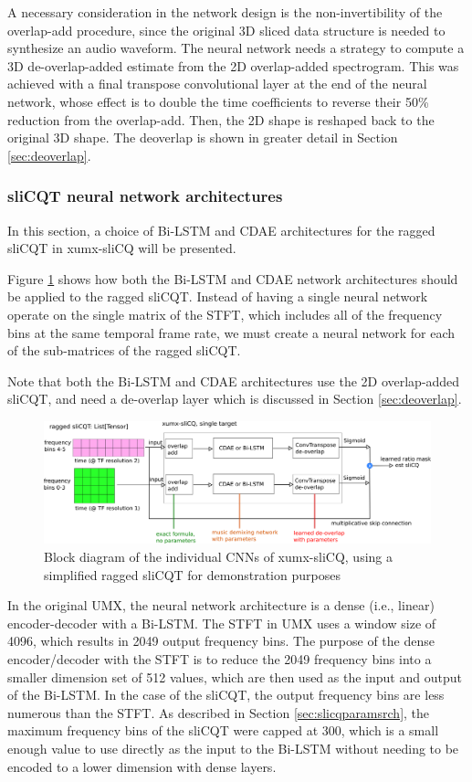 \documentclass[report.tex]{subfiles}
\begin{document}
A necessary consideration in the network design is the non-invertibility of the overlap-add procedure, since the original 3D sliced data structure is needed to synthesize an audio waveform. The neural network needs a strategy to compute a 3D de-overlap-added estimate from the 2D overlap-added spectrogram. This was achieved with a final transpose convolutional layer at the end of the neural network, whose effect is to double the time coefficients to reverse their 50\% reduction from the overlap-add. Then, the 2D shape is reshaped back to the original 3D shape. The deoverlap is shown in greater detail in Section \ref{sec:deoverlap}.

\subsubsection{sliCQT neural network architectures}
\label{sec:slicqarches}

In this section, a choice of Bi-LSTM and CDAE architectures for the ragged sliCQT in xumx-sliCQ will be presented.

Figure \ref{fig:cdaeslicqt} shows how both the Bi-LSTM and CDAE network architectures should be applied to the ragged sliCQT. Instead of having a single neural network operate on the single matrix of the STFT, which includes all of the frequency bins at the same temporal frame rate, we must create a neural network for each of the sub-matrices of the ragged sliCQT.

Note that both the Bi-LSTM and CDAE architectures use the 2D overlap-added sliCQT, and need a de-overlap layer which is discussed in Section \ref{sec:deoverlap}.

\begin{figure}[ht]
	\centering
	\includegraphics[width=\textwidth]{./images-blockdiagrams/xumx_slicq_pertarget_cdae_bilstm.png}
	\caption{Block diagram of the individual CNNs of xumx-sliCQ, using a simplified ragged sliCQT for demonstration purposes}
	\label{fig:cdaeslicqt}
\end{figure}

In the original UMX, the neural network architecture is a dense (i.e., linear) encoder-decoder with a Bi-LSTM. The STFT in UMX uses a window size of 4096, which results in 2049 output frequency bins. The purpose of the dense encoder/decoder with the STFT is to reduce the 2049 frequency bins into a smaller dimension set of 512 values, which are then used as the input and output of the Bi-LSTM. In the case of the sliCQT, the output frequency bins are less numerous than the STFT. As described in Section \ref{sec:slicqparamsrch}, the maximum frequency bins of the sliCQT were capped at 300, which is a small enough value to use directly as the input to the Bi-LSTM without needing to be encoded to a lower dimension with dense layers.
\end{document}
